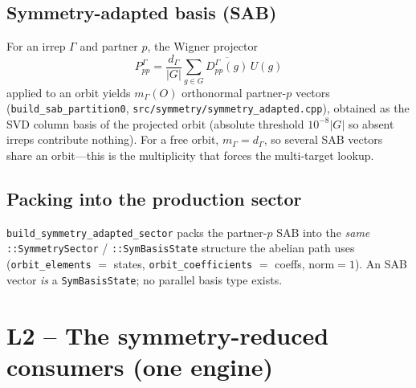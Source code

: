 \documentclass[11pt]{article}
\newcommand{\code}[1]{\texttt{\small #1}}
\newcommand{\file}[1]{\texttt{\footnotesize #1}}
\begin{document}
\subsection{Symmetry-adapted basis (SAB)}
For an irrep $\Gamma$ and partner $p$, the Wigner projector
\[
P^\Gamma_{pp} = \frac{d_\Gamma}{|G|}\sum_{g\in G} \overline{D^\Gamma_{pp}(g)}\,U(g)
\]
applied to an orbit yields $m_\Gamma(O)$ orthonormal partner-$p$ vectors
(\code{build\_sab\_partition0}, \file{src/symmetry/symmetry\_adapted.cpp}),
obtained as the SVD column basis of the projected orbit (absolute
threshold $10^{-8}|G|$ so absent irreps contribute nothing). For a free
orbit, $m_\Gamma=d_\Gamma$, so several SAB vectors share an orbit---this
is the multiplicity that forces the multi-target lookup.

\subsection{Packing into the production sector}
\code{build\_symmetry\_adapted\_sector} packs the partner-$p$ SAB into the
\emph{same} \code{::SymmetrySector} / \code{::SymBasisState} structure
the abelian path uses (\code{orbit\_elements} $=$ states,
\code{orbit\_coefficients} $=$ coeffs, $\text{norm}=1$). An SAB vector
\emph{is} a \code{SymBasisState}; no parallel basis type exists.

\section{L2 -- The symmetry-reduced consumers (one engine)}
\end{document}
